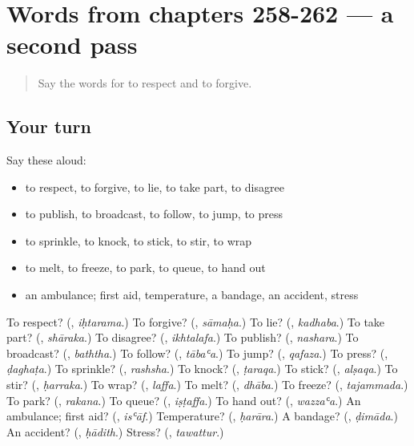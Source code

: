 \section[(dialogue)]{Words from chapters 258-262 — a second pass}

\label{lesson:AR-R262-second-pass-words-from-chapters-258-262}



\begin{quote}
Say the words for to respect and to forgive.
\end{quote}

\subsection*{Your turn}
Say these aloud:

\begin{itemize}
\raggedright
  \item to respect, to forgive, to lie, to take part, to disagree
  \item to publish, to broadcast, to follow, to jump, to press
  \item to sprinkle, to knock, to stick, to stir, to wrap
  \item to melt, to freeze, to park, to queue, to hand out
  \item an ambulance; first aid, temperature, a bandage, an accident, stress
\end{itemize}

\begin{tcolorbox}[breakable,colback=teal!4,colframe=teal!35!black,title={Before you move on}]
To respect? (\textbf{}, \emph{iḥtarama}.) To forgive? (\textbf{}, \emph{sāmaḥa}.) To lie? (\textbf{}, \emph{kadhaba}.) To take part? (\textbf{}, \emph{shāraka}.) To disagree? (\textbf{}, \emph{ikhtalafa}.) To publish? (\textbf{}, \emph{nashara}.) To broadcast? (\textbf{}, \emph{baththa}.) To follow? (\textbf{}, \emph{tābaʿa}.) To jump? (\textbf{}, \emph{qafaza}.) To press? (\textbf{}, \emph{ḍaghaṭa}.) To sprinkle? (\textbf{}, \emph{rashsha}.) To knock? (\textbf{}, \emph{ṭaraqa}.) To stick? (\textbf{}, \emph{alṣaqa}.) To stir? (\textbf{}, \emph{ḥarraka}.) To wrap? (\textbf{}, \emph{laffa}.) To melt? (\textbf{}, \emph{dhāba}.) To freeze? (\textbf{}, \emph{tajammada}.) To park? (\textbf{}, \emph{rakana}.) To queue? (\textbf{}, \emph{iṣṭaffa}.) To hand out? (\textbf{}, \emph{wazzaʿa}.) An ambulance; first aid? (\textbf{}, \emph{isʿāf}.) Temperature? (\textbf{}, \emph{ḥarāra}.) A bandage? (\textbf{}, \emph{ḍimāda}.) An accident? (\textbf{}, \emph{ḥādith}.) Stress? (\textbf{}, \emph{tawattur}.)
\end{tcolorbox}

